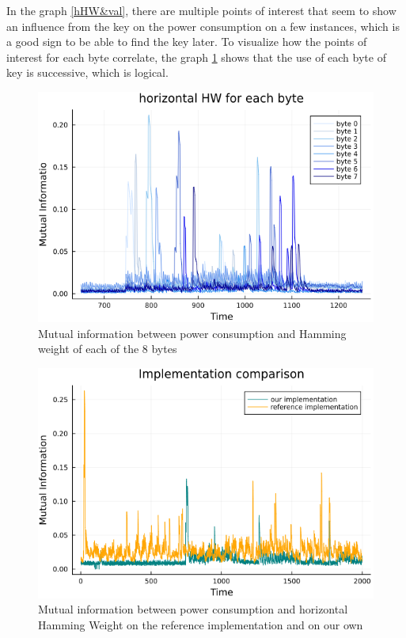 \documentclass[a4paper,11pt,twocolumn]{article}
\begin{document}
	In the graph \ref{hHW&val}, there are multiple points of interest that seem to show an influence from the key on the power consumption on a few instances, which is a good sign to be able to find the key later. To visualize how the points of interest for each byte correlate, the graph \ref{hHW8_zoom} shows that the use of each byte of key is successive, which is logical. 
	
	\begin{figure}[h]
		\centering
		\includegraphics[scale=0.4]{hHW_8_bytes_zoom}
		\caption{Mutual information between power consumption and Hamming weight of each of the 8 bytes}
		\label{hHW8_zoom}
	\end{figure}
	
	\begin{figure}[h]
		\centering
		\includegraphics[scale=0.4]{comp_ref_hHW}
		\caption{Mutual information between power consumption and horizontal Hamming Weight on the reference implementation and on our own}
		\label{compref}
	\end{figure}
	
\end{document}
